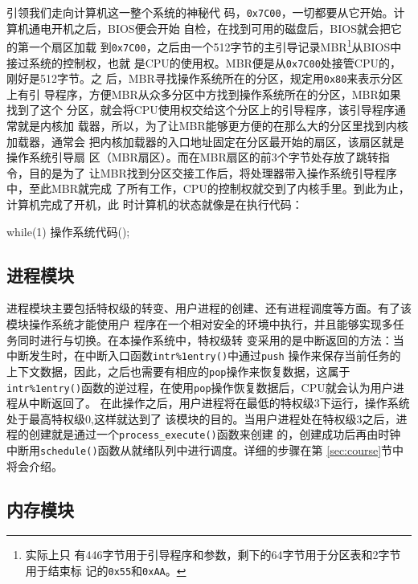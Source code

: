 引领我们走向计算机这一整个系统的神秘代
码，\texttt{0x7C00}，一切都要从它开始。计算机通电开机之后，BIOS便会开始
自检，在找到可用的磁盘后，BIOS就会把它的第一个扇区加载
到\texttt{0x7C00}，之后由一个512字节的主引导记录MBR\footnote{实际上只
  有446字节用于引导程序和参数，剩下的64字节用于分区表和2字节用于结束标
  记的\texttt{0x55}和\texttt{0xAA}。}从BIOS中接过系统的控制权，也就
是CPU的使用权。MBR便是从\texttt{0x7C00}处接管CPU的，刚好是512字节。之
后，MBR寻找操作系统所在的分区，规定用\texttt{0x80}来表示分区上有引
导程序，方便MBR从众多分区中方找到操作系统所在的分区，MBR如果找到了这个
分区，就会将CPU使用权交给这个分区上的引导程序，该引导程序通常就是内核加
载器，所以，为了让MBR能够更方便的在那么大的分区里找到内核加载器，通常会
把内核加载器的入口地址固定在分区最开始的扇区，该扇区就是操作系统引导扇
区（MBR扇区）。而在MBR扇区的前3个字节处存放了跳转指令，目的是为了
让MBR找到分区交接工作后，将处理器带入操作系统引导程序中，至此MBR就完成
了所有工作，CPU的控制权就交到了内核手里。到此为止，计算机完成了开机，此
时计算机的状态就像是在执行代码：

\begin{codeblock}
\begin{ccode}
while(1)
{
  操作系统代码();
}
\end{ccode}  
\end{codeblock}


\subsection{进程模块}

进程模块主要包括特权级的转变、用户进程的创建、还有进程调度等方面。有了该模块操作系统才能使用户
程序在一个相对安全的环境中执行，并且能够实现多任务同时进行与切换。在本操作系统中，特权级转
变采用的是中断返回的方法：当中断发生时，在中断入口函数\texttt{intr\%1entry()}中通过\texttt{push}
操作来保存当前任务的上下文数据，因此，之后也需要有相应的\texttt{pop}操作来恢复数据，这属于
\texttt{intr\%1entry()}函数的逆过程，在使用\texttt{pop}操作恢复数据后，CPU就会认为用户进程从中断返回了。
在此操作之后，用户进程将在最低的特权级3下运行，操作系统处于最高特权级0,这样就达到了
该模块的目的。当用户进程处在特权级3之后，进程的创建就是通过一个\texttt{process\_execute()}函数来创建
的，创建成功后再由时钟中断用\texttt{schedule()}函数从就绪队列中进行调度。详细的步骤在第
\ref{sec:course}节中将会介绍。

\subsection{内存模块}

